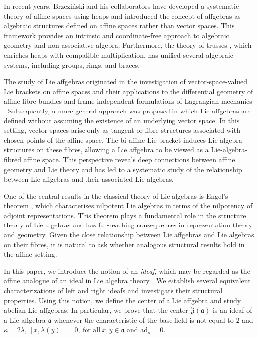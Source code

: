 \documentclass{article}
\theoremstyle{definition}
\theoremstyle{remark}
\theoremstyle{plain}
\begin{document}
In recent years, Brzezi\'{n}ski and his collaborators \cite{Brz2019Truss, BBRS1, Bre1, And1, Brz1, Brz2, Brz3} have developed a systematic theory of affine spaces using heaps and introduced the concept of affgebras \cite{And2, Brz222, Brz26} as algebraic structures defined on affine spaces rather than vector spaces. This framework provides an intrinsic and coordinate-free approach to algebraic geometry and non-associative algebra. Furthermore, the theory of trusses \cite{Brz22}, which enriches heaps with compatible multiplication, has unified several algebraic systems, including groups, rings, and braces.

The study of Lie affgebras \cite{Gra1} originated in the investigation of vector-space-valued Lie brackets on affine spaces and their applications to the differential geometry of affine fibre bundles and frame-independent formulations of Lagrangian mechanics \cite{Tul1, Gra3, Gra2}. Subsequently, a more general approach was proposed in which Lie affgebras are defined without assuming the existence of an underlying vector space. In this setting, vector spaces arise only as tangent or fibre structures associated with chosen points of the affine space. The bi-affine Lie bracket induces Lie algebra structures on these fibres, allowing a Lie affgebra to be viewed as a Lie-algebra-fibred affine space. This perspective reveals deep connections between affine geometry and Lie theory and has led to a systematic study of the relationship between Lie affgebras and their associated Lie algebras.


One of the central results in the classical theory of Lie algebras is Engel’s theorem \cite{Hum}, which characterizes nilpotent Lie algebras in terms of the nilpotency of adjoint representations. This theorem plays a fundamental role in the structure theory of Lie algebras and has far-reaching consequences in representation theory and geometry. Given the close relationship between Lie affgebras and Lie algebras on their fibres, it is natural to ask whether analogous structural results hold in the affine setting.

In this paper, we introduce the notion of an \emph{ideaf}, which may be regarded as the affine analogue of an ideal in Lie algebra theory \cite{Jac1}. We establish several equivalent characterizations of left and right ideafs and investigate their structural properties. Using this notion, we define the center of a Lie affgebra and study abelian Lie affgebras. In particular, we prove that the center $\mathfrak{Z}(\mathfrak{a})$ is an ideaf of a Lie affgebra $\mathfrak{a}$ whenever the characteristic of the base field is not equal to $2$ and $\kappa=2\lambda$, $[x, \lambda(y)]=0,~ \text{for all}~ x, y \in \mathfrak{a}$ and $\text{ad}_s=0$.
\end{document}

